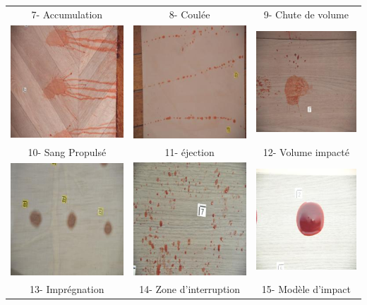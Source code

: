 \documentclass[a4paper]{article}
\begin{document}
\begin{table}[ht]
\begin{tabular}{ccc}
        7- Accumulation & 8- Coulée & 9- Chute de volume \\
        \includegraphics[width=0.15\linewidth]{../asset/data_labo/10_lino_933.jpg} & \includegraphics[width=0.15\linewidth]{../asset/data_labo/11_carrelage_905.jpg} & \includegraphics[width=0.15\linewidth]{../asset/data_labo/12_bois_326.jpg} \\
        10- Sang Propulsé & 11- éjection & 12- Volume impacté \\
        \includegraphics[width=0.15\linewidth]{../asset/data_labo/13_carrelage_7374.jpg} & \includegraphics[width=0.15\linewidth]{../asset/data_labo/14_lino_6320.jpg} & \includegraphics[width=0.15\linewidth]{../asset/data_labo/15_p1040.jpg} \\
        13- Imprégnation & 14- Zone d'interruption & 15- Modèle d'impact \\

\end{tabular}
\end{table}
\end{document}
